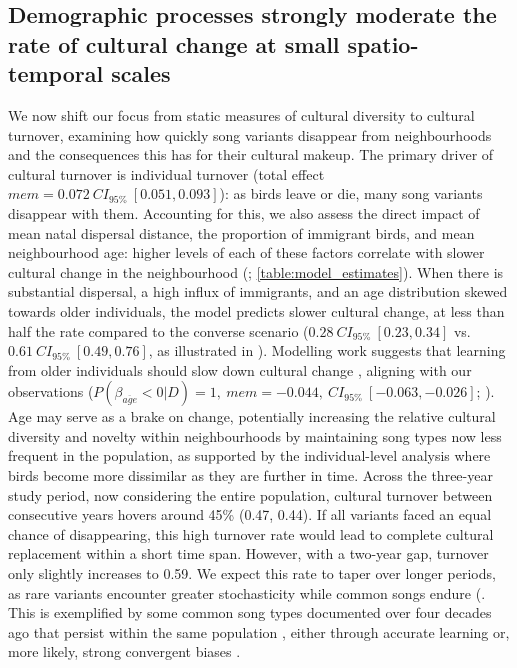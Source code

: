 \subsection{Demographic processes strongly moderate the rate of cultural change at small spatio-temporal scales}

We now shift our focus from static measures of cultural diversity to cultural turnover, examining how quickly song variants disappear from neighbourhoods and the consequences this has for their cultural makeup. The primary driver of cultural turnover is individual turnover (total effect $mem = 0.072~CI_{95\%}~[0.051, 0.093]$): as birds leave or die, many song variants disappear with them. Accounting for this, we also assess the direct impact of mean natal dispersal distance, the proportion of immigrant birds, and mean neighbourhood age: higher levels of each of these factors correlate with slower cultural change in the neighbourhood (; \autoref{table:model_estimates}). When there is substantial dispersal, a high influx of immigrants, and an age distribution skewed towards older individuals, the model predicts slower cultural change, at less than half the rate compared to the converse scenario ($0.28~CI_{95\%}~[0.23, 0.34]$ vs. $0.61~CI_{95\%}~[0.49, 0.76]$, as illustrated in ).
Modelling work suggests that learning from older individuals should slow down cultural change \parencite{kirby2021}, aligning with our observations ($P(\beta_{\overline{age}} < 0 | D) = 1,~mem=-0.044,~CI_{95\%}~[-0.063, -0.026]$; ). Age may serve as a brake on change, potentially increasing the relative cultural diversity and novelty within neighbourhoods by maintaining song types now less frequent in the population, as supported by the individual-level analysis where birds become more dissimilar as they are further in time.
Across the three-year study period, now considering the entire population, cultural turnover between consecutive years hovers around 45\% (0.47, 0.44). If all variants faced an equal chance of disappearing, this high turnover rate would lead to complete cultural replacement within a short time span. However, with a two-year gap, turnover only slightly increases to 0.59. We expect this rate to taper over longer periods, as rare variants encounter greater stochasticity while common songs endure (. This is exemplified by some common song types documented over four decades ago that persist within the same population \parencite{mcgregor1982b, keen2020}, either through accurate learning or, more likely, strong convergent biases \parencite{lachlan2018, tchernichovski2021, james2017, claidiere2007}.


